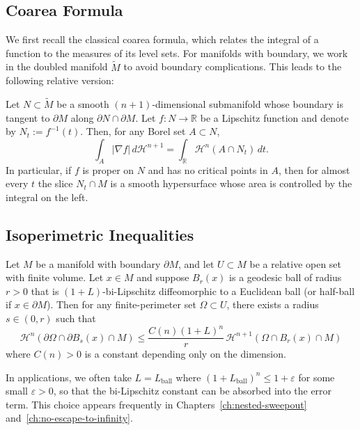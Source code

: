 \subsection{Coarea Formula}
We first recall the classical coarea formula, which relates the integral of a function to the measures of its level sets.
For manifolds with boundary, we work in the doubled manifold $\widetilde M$ to avoid boundary
complications. This leads to the following relative version:

\begin{theorem}\label{thm:coarea-formula}
Let $N\subset \widetilde M$ be a smooth $(n+1)$-dimensional submanifold whose boundary is tangent to
$\partial M$ along $\partial N\cap \partial M$. Let $f:N\to \mathbb{R}$ be a Lipschitz function and
denote by $N_t:=f^{-1}(t)$. Then, for any Borel set $A\subset N$,
\[
    \int_A |\nabla f|\,d\mathcal{H}^{n+1}
    =\int_{\mathbb{R}} \mathcal{H}^n(A\cap N_t)\, dt.
\]
In particular, if $f$ is proper on $N$ and has no critical points in $A$, then for almost every $t$
the slice $N_t\cap M$ is a smooth hypersurface whose area is controlled by the integral on the left.
\end{theorem}

\subsection{Isoperimetric Inequalities}
\begin{theorem}\label{thm:relative-isoperimetric}
Let $M$ be a manifold with boundary $\partial M$, and let $U\subset M$ be a relative open set with
finite volume. Let $x\in M$ and suppose $B_r(x)$ is a geodesic ball of radius $r>0$ that is
$(1+L)$-bi-Lipschitz diffeomorphic to a Euclidean ball (or half-ball if $x\in\partial M$). Then
for any finite-perimeter set $\Omega\subset U$, there exists a radius $s\in(0,r)$ such that
\begin{equation*}
    \mathcal{H}^n(\partial\Omega\cap \partial B_s(x)\cap M)
    \leq \frac{C(n)(1+L)^n}{r}\,\mathcal{H}^{n+1}(\Omega\cap B_r(x)\cap M)
\end{equation*}
where $C(n)>0$ is a constant depending only on the dimension.
\end{theorem}

\begin{remark}
In applications, we often take $L=L_{\mathrm{ball}}$ where $(1+L_{\mathrm{ball}})^n\le 1+\varepsilon$
for some small $\varepsilon>0$, so that the bi-Lipschitz constant can be absorbed into the error
term. This choice appears frequently in Chapters~\ref{ch:nested-sweepout} and~\ref{ch:no-escape-to-infinity}.
\end{remark}

